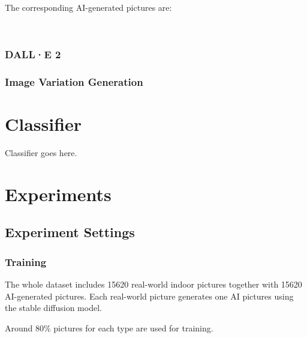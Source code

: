 \documentclass[11pt]{article}
\begin{document}
The corresponding AI-generated pictures are:


\begin{figure}[htbp]
\centering
{}%
\ \  \ \  \ \  \ \
%
\end{figure}



\subsubsection{DALL·E 2}

\subsubsection{Image Variation Generation}

\section{Classifier}

Classifier goes here.

\section{Experiments}



\subsection{Experiment Settings}

\subsubsection{Training}

The whole dataset includes 15620 real-world indoor pictures together with 15620 AI-generated pictures. Each real-world picture generates one AI pictures using the stable diffusion model.

Around 80\% pictures for each type are used for training.
\end{document}
